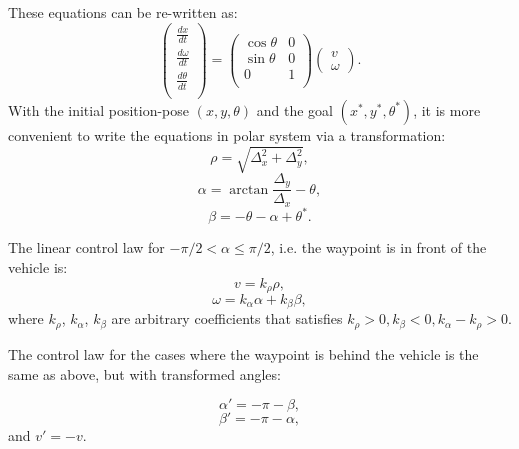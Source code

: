 \documentclass[12pt]{article}
\begin{document}
These equations can be re-written as:
$$
\begin{pmatrix}
\frac{d x}{dt} \\
\frac{d \omega}{dt} \\
\frac{d \theta}{dt} \\
\end{pmatrix}
=
\begin{pmatrix}
\cos \theta & 0 \\
\sin \theta & 0 \\
0 & 1\\
\end{pmatrix}
\begin{pmatrix}
v \\
\omega
\end{pmatrix}.
$$
With the initial position-pose $(x,y,\theta)$ and the goal $(x^*,y^*,\theta^*)$, it is more convenient to write the equations in polar system via a transformation:
$$\rho=\sqrt{\Delta_x^2+\Delta_y^2},$$
$$\alpha=\arctan \frac{\Delta_y}{\Delta_x}-\theta,$$
$$\beta=-\theta-\alpha+\theta^*.$$

The linear control law for $-\pi/2<\alpha\le \pi/2$, i.e. the waypoint is in front of the vehicle is:
$$v=k_\rho \rho,$$
$$\omega=k_\alpha \alpha+k_\beta \beta,$$
where $k_\rho$, $k_\alpha$, $k_\beta$ are arbitrary coefficients that satisfies $k_\rho>0, k_\beta<0,k_\alpha-k_\rho>0.$

The control law for the cases where the waypoint is behind the vehicle is the same as above, but with transformed angles:

$$\alpha'=-\pi-\beta,$$
$$\beta'=-\pi-\alpha,$$
and $v'=-v$.

%
\end{document}
